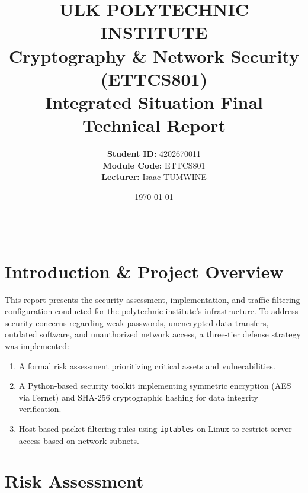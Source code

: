 \documentclass[11pt,a4paper]{article}
\title{\textbf{ULK POLYTECHNIC INSTITUTE}\\ \Large Cryptography \& Network Security (ETTCS801)\\ \large Integrated Situation Final Technical Report}
\author{\textbf{Student ID:} 4202670011 \\ \textbf{Module Code:} ETTCS801 \\ \textbf{Lecturer:} Isaac TUMWINE}
\date{\today}
\begin{document}
\maketitle

\hrule
\vspace{0.5cm}

\section{Introduction \& Project Overview}
This report presents the security assessment, implementation, and traffic filtering configuration conducted for the polytechnic institute's infrastructure. To address security concerns regarding weak passwords, unencrypted data transfers, outdated software, and unauthorized network access, a three-tier defense strategy was implemented:
\begin{enumerate}
    \item A formal risk assessment prioritizing critical assets and vulnerabilities.
    \item A Python-based security toolkit implementing symmetric encryption (AES via Fernet) and SHA-256 cryptographic hashing for data integrity verification.
    \item Host-based packet filtering rules using \texttt{iptables} on Linux to restrict server access based on network subnets.
\end{enumerate}


\section{Risk Assessment}
\end{document}
